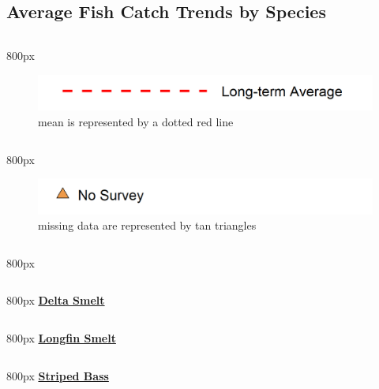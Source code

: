 \documentclass[
]{book}
\begin{document}
\hypertarget{average-fish-catch-trends-by-species-4}{%
\subsection{Average Fish Catch Trends by Species}\label{average-fish-catch-trends-by-species-4}}

\begin{column}{800px\textwidth}
\begin{figure}
\includegraphics[width=15.25in]{figures/mline} \caption{mean is represented by a dotted red line}\label{fig:unnamed-chunk-134}
\end{figure}
\end{column}

\begin{column}{800px\textwidth}
\begin{figure}
\includegraphics[width=15.25in]{figures/mpoint} \caption{missing data are represented by tan triangles}\label{fig:unnamed-chunk-135}
\end{figure}
\end{column}

\begin{column}{800px\textwidth}
\end{column}

\begin{column}{800px\textwidth}
\textbf{\href{http://calfish.ucdavis.edu/species/?uid=47\&ds=698}{Delta Smelt}}
\end{column}

\begin{column}{800px\textwidth}
\textbf{\href{http://calfish.ucdavis.edu/species/?uid=87\&ds=698}{Longfin Smelt}}
\end{column}

\begin{column}{800px\textwidth}
\textbf{\href{http://calfish.ucdavis.edu/species/?uid=160\&ds=698}{Striped Bass}}
\end{column}
\end{document}
